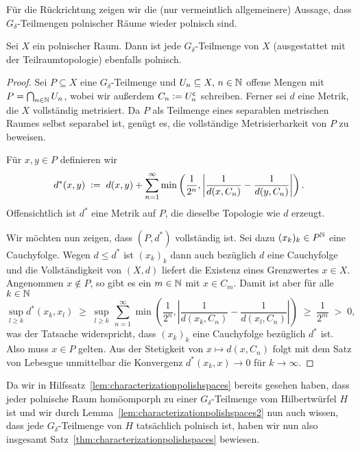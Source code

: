 \documentclass[../main/main.tex]{subfiles}
\begin{document}
	Für die Rückrichtung zeigen wir die (nur vermeintlich allgemeinere) Aussage, 
	dass $G_\delta$-Teilmengen polnischer Räume wieder polnisch sind.
	
	\begin{Hilfssatz}
		\label{lem:characterizationpolishspaces2}
		Sei $X$ ein polnischer Raum. Dann ist jede $G_\delta$-Teilmenge 
		von $X$ (ausgestattet mit der Teilraumtopologie) ebenfalls polnisch.
	\end{Hilfssatz}
	
	\begin{proof}
		Sei $P \subseteq X$ eine $G_\delta$-Teilmenge und 
		$U_n \subseteq X, \, n \in \mathbb{N}$ offene Mengen mit 
		$P = \bigcap_{n \in \mathbb{N}} U_n$, wobei wir außerdem 
		$C_n \vcentcolon = U_n^{\mathsf{c}}$ schreiben. Ferner sei 
		$d$ eine Metrik, die $X$ vollständig metrisiert. 
		Da $P$ als Teilmenge eines separablen metrischen Raumes 
		selbst separabel ist, genügt es, die vollständige Metrisierbarkeit 
		von $P$ zu beweisen.
		
		Für $x, y \in P$ definieren wir
		\[d^\ast(x, y) \; \vcentcolon = \; d(x, y) + \sum_{n=1}^{\infty} \min \left(
		\frac{1}{2^n}, \left| \frac{1}{d(x, C_n)} - \frac{1}{d(y, C_n)} \right|
		\right) \text{.}\]
		Offensichtlich ist $d^\ast$ eine Metrik auf $P$, 
		die dieselbe Topologie wie $d$ erzeugt. 
		
		Wir möchten nun zeigen, dass $(P, d^\ast)$ vollständig ist. 
		Sei dazu $(x_k)_k \in P^{\mathbb{N}}$ eine Cauchyfolge. Wegen $d \leq d^\ast$ 
		ist $(x_k)_k$ dann auch bezüglich $d$ eine Cauchyfolge und die 
		Vollständigkeit von $(X, d)$ liefert die Existenz eines Grenzwertes 
		$x \in X$. Angenommen $x \notin P$, so gibt es ein $m \in \mathbb{N}$ mit 
		$x \in C_m$. Damit ist aber für alle $k \in \mathbb{N}$
		$$\sup_{l \geq k} d^\ast(x_k, x_l) \; \geq \; \sup_{l \geq k} 
		\, \sum_{n=1}^{\infty} \min \left(
		\frac{1}{2^n}, \left| \frac{1}{d(x_k, C_n)} -
		\frac{1}{d(x_l, C_n)} \right|
		\right) \; \geq \; \frac{1}{2^m} \; > \; 0 \text{,}$$
		was der Tatsache widerspricht, dass $(x_k)_k$ eine Cauchyfolge 
		bezüglich $d^\ast$ ist. Also muss $x \in P$ gelten. 
		Aus der Stetigkeit von $x \mapsto d(x, C_n)$ folgt mit dem 
		Satz von Lebesgue unmittelbar die Konvergenz 
		$d^\ast(x_k, x) \to 0$ für $k \to \infty$.
	\end{proof}
	
	Da wir in Hilfssatz~\ref{lem:characterizationpolishspaces} bereits 
	gesehen haben, dass jeder polnische Raum homöomporph zu einer 
	$G_\delta$-Teilmenge vom Hilbertwürfel $H$ ist und wir durch 
	Lemma~\ref{lem:characterizationpolishspaces2} nun auch wissen, 
	dass jede $G_\delta$-Teilmenge von $H$ tatsächlich polnisch ist, 
	haben wir nun also insgesamt Satz~\ref{thm:characterizationpolishspaces}
	bewiesen.
	
\end{document}
